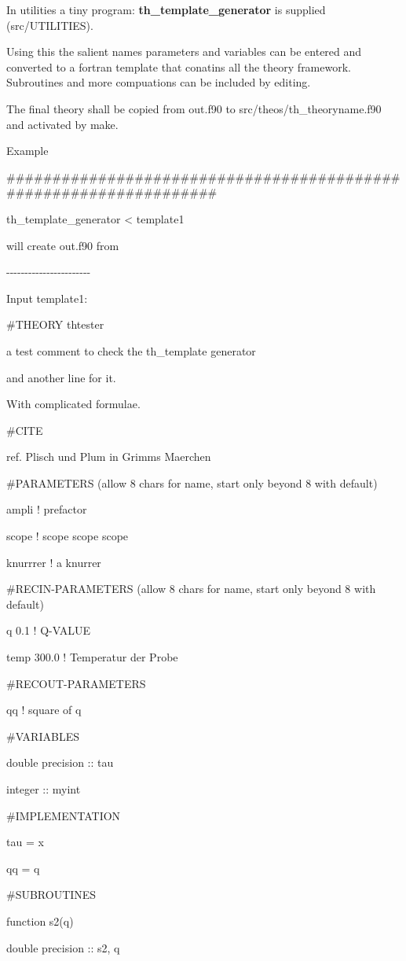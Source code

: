 \documentclass[]{article}
\begin{document}
In utilities a tiny program: \textbf{th\_template\_generator} is
supplied (src/UTILITIES).

Using this the salient names parameters and variables can be entered and
converted to a fortran template that conatins all the theory framework.
Subroutines and more compuations can be included by editing.

The final theory shall be copied from out.f90 to
src/theos/th\_theoryname.f90 and activated by make.

Example

\#\#\#\#\#\#\#\#\#\#\#\#\#\#\#\#\#\#\#\#\#\#\#\#\#\#\#\#\#\#\#\#\#\#\#\#\#\#\#\#\#\#\#\#\#\#\#\#\#\#\#\#\#\#\#\#\#\#\#\#\#\#\#\#\#\#

th\_template\_generator \textless{} template1

will create out.f90 from

-\/-\/-\/-\/-\/-\/-\/-\/-\/-\/-\/-\/-\/-\/-\/-\/-\/-\/-\/-\/-\/-\/-

Input template1:

\#THEORY thtester

a test comment to check the th\_template generator

and another line for it.

With complicated formulae.

\#CITE

ref. Plisch und Plum in Grimms Maerchen

\#PARAMETERS (allow 8 chars for name, start only beyond 8 with default)

ampli ! prefactor

scope ! scope scope scope

knurrrer ! a knurrer

\#RECIN-PARAMETERS (allow 8 chars for name, start only beyond 8 with
default)

q 0.1 ! Q-VALUE

temp 300.0 ! Temperatur der Probe

\#RECOUT-PARAMETERS

qq ! square of q

\#VARIABLES

double precision :: tau

integer :: myint

\#IMPLEMENTATION

tau = x

qq = q

\#SUBROUTINES

function s2(q)

double precision :: s2, q
\end{document}
